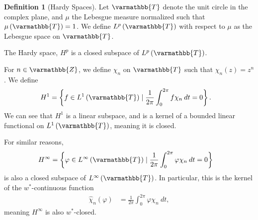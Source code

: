 \documentclass[12pt]{extarticle}
\newcommand{\Z}{\mathbb{Z}}
\newcommand{\set}[1]{\left\{#1\right\}}
\theoremstyle{plain}
\theoremstyle{definition}
\newtheorem*{definition}{Definition}
\theoremstyle{note}
\renewcommand*{\mathbb}[1]{\varmathbb{#1}}
\renewcommand{\newline}{\hfill\break}
\begin{document}
\begin{definition}[Hardy Spaces]
  Let $\mathbb{T}$ denote the unit circle in the complex plane, and $\mu$ the Lebesgue measure normalized such that $\mu\left(\mathbb{T}\right) = 1$. We define $L^{p}\left(\mathbb{T}\right)$ with respect to $\mu$ as the Lebesgue space on $\mathbb{T}$.\newline

  The Hardy space, $H^{p}$ is a closed subspace of $L^{p}\left(\mathbb{T}\right)$.\newline

  For $n\in \Z$, we define $\chi_n$ on $\mathbb{T}$ such that $\chi_n(z) = z^n$. We define
  \begin{align*}
    H^1 &= \set{f\in L^{1}\left(\mathbb{T}\right) \mid \frac{1}{2\pi}\int_{0}^{2\pi}f\chi_n\:dt = 0}.
  \end{align*}
  We can see that $H^1$ is a linear subspace, and is a kernel of a bounded linear functional on $L^1\left(\mathbb{T}\right)$, meaning it is closed.\newline

  For similar reasons,
  \begin{align*}
    H^{\infty} &= \set{\varphi \in L^{\infty}\left(\mathbb{T}\right) \mid \frac{1}{2\pi}\int_{0}^{2\pi}\varphi \chi_n\:dt = 0}
  \end{align*}
  is also a closed subspace of $L^{\infty}\left(\mathbb{T}\right)$. In particular, this is the kernel of the $w^{\ast}$-continuous function
  \begin{align*}
    \hat{\chi}_n\left(\varphi\right) &= \frac{1}{2\pi}\int_{0}^{2\pi} \varphi \chi_n\:dt,
  \end{align*}
  meaning $H^{\infty}$ is also $w^{\ast}$-closed.
\end{definition}
\end{document}
